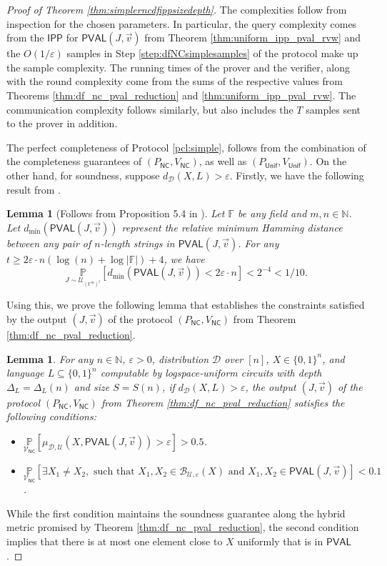 \documentclass[11pt]{article}
\newtheorem{lemma}[theorem]{Lemma}
\newcommand{\NC}{\mathsf{NC}}
\newcommand{\PVAL}{\mathsf{PVAL}}
\newcommand{\IPP}{\mathsf{IPP}}
\newcommand{\F}{\mathbb{F}}
\newcommand{\N}{\mathbb{N}}
\newcommand{\sU}{\mathcal{U}}
\newcommand{\sD}{\mathcal{D}}
\newcommand{\sB}{\mathcal{B}}
\begin{document}
\begin{proof}[Proof of Theorem \ref{thm:simplerncdfippsizedepth}]
The complexities follow from inspection for the chosen parameters. In particular, the query complexity comes from the $\IPP$ for $\PVAL(J,\vec{v})$ from Theorem \ref{thm:uniform_ipp_pval_rvw} and the $O(1/\varepsilon)$ samples in Step \ref{step:dfNCsimplesamples} of the protocol make up the sample complexity. The running times of the prover and the verifier, along with the round complexity come from the sums of the respective values from Theorems \ref{thm:df_nc_pval_reduction} and \ref{thm:uniform_ipp_pval_rvw}. The communication complexity follows similarly, but also includes the $T$ samples sent to the prover in addition.

The perfect completeness of Protocol \ref{pcl:simple}, follows from the combination of the completeness guarantees of $(P_{\NC}, V_{\NC})$, as well as $(P_{\mathsf{Unif}}, V_{\mathsf{Unif}})$. On the other hand, for soundness, suppose $d_{\sD}(X,L)>\varepsilon$. Firstly, we have the following result from \cite{RR20_batch_polylog}.
\begin{lemma}[Follows from Proposition 5.4 in \cite{RR20_batch_polylog}]
\label{lem:rr20_min_dist_random_pval}
Let $\F$ be any field and $m,n\in \N$. Let $d_{\min}(\PVAL(J,\Vec{v}))$ represent the relative minimum Hamming distance between any pair of $n$-length strings in $\PVAL(J,\Vec{v})$. For any $t \geq 2\varepsilon\cdot n (\log (n)+\log |\F|)+4$, we have
\begin{equation*}
    \underset{J\sim \sU_{(\F^{m})^{t}}}{\mathbb{P}}[d_{\min}(\PVAL(J,\vec{v}))<2\varepsilon \cdot n]<2^{-4}<1/10.
\end{equation*}
\end{lemma}

Using this, we prove the following lemma that establishes the constraints satisfied by the output $(J,\Vec{v})$ of the protocol $(P_\NC, V_\NC)$ from Theorem \ref{thm:df_nc_pval_reduction}. 
\begin{lemma}
\label{lem:PVALasaCodeSoundness}
For any $n\in\mathbb{N}$, $\varepsilon>0$, distribution $\sD$ over $[n]$, $X\in\{0,1\}^{n}$, and language $L\subseteq \{0,1\}^{n}$ computable by logspace-uniform  circuits with depth $\Delta_{L}=\Delta_{L}(n)$ and size $S=S(n)$, if $d_{\sD}(X,L)>\varepsilon$, the output $(J,\vec{v})$ of the protocol $(P_\NC,V_\NC)$ from Theorem \ref{thm:df_nc_pval_reduction} satisfies the following conditions:
\begin{itemize}
    \item $\underset{\mathcal{V}_{\NC}}{\mathbb{P}}[\mu_{\sD,\mathcal{U}}(X,\PVAL(J,\vec{v}))>\varepsilon]>0.5$.
    \item $\underset{\mathcal{V}_{\NC}}{\mathbb{P}}[\exists X_1 \neq X_2, \text{ such that } X_1, X_2 \in \sB_{\sU,\varepsilon}(X) \text{ and } X_{1},X_{2} \in \PVAL(J,\vec{v})] < 0.1$.
\end{itemize}
\end{lemma}
While the first condition maintains the soundness guarantee along the hybrid metric promised by Theorem \ref{thm:df_nc_pval_reduction}, the second condition implies that there is at most one element close to $X$ uniformly that is in $\PVAL$. 



\end{proof}
\end{document}
